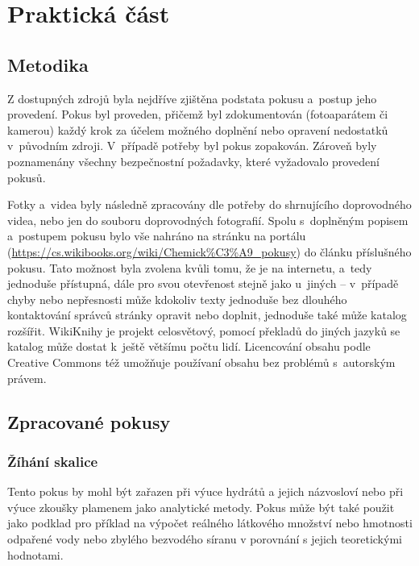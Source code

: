 \chapter{Praktická část}

\section{Metodika}
Z dostupných zdrojů byla nejdříve zjištěna podstata pokusu a~postup jeho provedení. Pokus byl proveden, přičemž byl zdokumentován (fotoaparátem či kamerou) každý krok za účelem možného doplnění nebo opravení nedostatků v~původním zdroji. V~případě potřeby byl pokus zopakován. Zároveň byly poznamenány všechny bezpečnostní požadavky, které vyžadovalo provedení pokusů.

Fotky a~videa byly následně zpracovány dle potřeby do shrnujícího doprovodného videa, nebo jen do souboru doprovodných fotografií. Spolu s~doplněným popisem a~postupem pokusu bylo vše nahráno na stránku  na portálu  (\url{https://cs.wikibooks.org/wiki/Chemick%C3%A9_pokusy}) do článku příslušného pokusu. Tato možnost byla zvolena kvůli tomu, že je na internetu, a~tedy jednoduše přístupná, dále pro svou otevřenost stejně jako u~jiných \uv{wiki projektů} -- v~případě chyby nebo nepřesnosti může kdokoliv texty jednoduše bez dlouhého kontaktování správců stránky opravit nebo doplnit, jednoduše také může katalog rozšířit. WikiKnihy je projekt celosvětový, pomocí překladů do jiných jazyků se katalog může dostat k~ještě většímu počtu lidí. Licencování obsahu podle Creative Commons též umožňuje používaní obsahu bez problémů s~autorským právem.

\section{Zpracované pokusy}
\subsection{Žíhání skalice}


Tento pokus by mohl být zařazen při výuce hydrátů a jejich názvosloví nebo při výuce zkoušky plamenem jako analytické metody. Pokus může být také použit jako podklad pro příklad na výpočet reálného látkového množství nebo hmotnosti odpařené vody nebo zbylého bezvodého síranu v porovnání s jejich teoretickými hodnotami.\\

